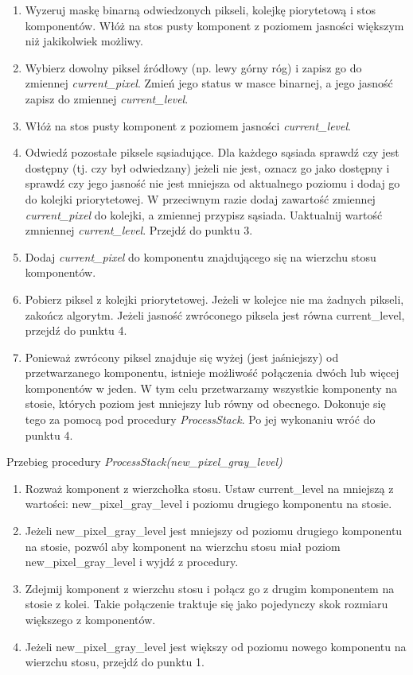\begin{enumerate} \item Wyzeruj maskę binarną odwiedzonych pikseli, kolejkę
    piorytetową i stos komponentów. Włóż na stos pusty komponent z poziomem
    jasności większym niż jakikolwiek możliwy. \item Wybierz dowolny piksel
    źródłowy (np. lewy górny róg) i zapisz go do zmiennej
    \textit{current\_pixel}.  Zmień jego status w masce binarnej, a jego
    jasność zapisz do zmiennej \textit{current\_level}. \item Włóż na stos
    pusty komponent z poziomem jasności \textit{current\_level}. \item Odwiedź
    pozostałe piksele sąsiadujące. Dla każdego sąsiada sprawdź czy jest
    dostępny (tj. czy był odwiedzany) jeżeli nie jest, oznacz go jako dostępny
    i sprawdź czy jego jasność nie jest mniejsza od aktualnego poziomu i dodaj
    go do kolejki priorytetowej. W przeciwnym razie dodaj zawartość zmiennej
    \textit{current\_pixel} do kolejki, a zmiennej przypisz sąsiada. Uaktualnij
    wartość zmniennej \textit{current\_level}. Przejdź do punktu 3. \item Dodaj
    \textit{current\_pixel} do komponentu znajdującego się na wierzchu stosu
    komponentów. \item Pobierz piksel z kolejki priorytetowej.  Jeżeli w
    kolejce nie ma żadnych pikseli, zakończ algorytm. Jeżeli jasność zwróconego
    piksela jest równa current\_level, przejdź do punktu 4. \item Ponieważ
    zwrócony piksel znajduje się wyżej (jest jaśniejszy) od przetwarzanego
    komponentu, istnieje możliwość połączenia dwóch lub więcej komponentów w
    jeden. W tym celu przetwarzamy wszystkie komponenty na stosie, których
    poziom jest mniejszy lub równy od obecnego. Dokonuje się tego za pomocą pod
    procedury \textit{ProcessStack}. Po jej wykonaniu wróć do punktu 4.
\end{enumerate}

Przebieg procedury \textit{ProcessStack(new\_pixel\_gray\_level)}
\begin{enumerate} \item Rozważ komponent z wierzchołka stosu. Ustaw
    current\_level na mniejszą z wartości: new\_pixel\_gray\_level i poziomu
    drugiego komponentu na stosie. \item Jeżeli new\_pixel\_gray\_level jest
    mniejszy od poziomu drugiego komponentu na stosie, pozwól aby komponent na
    wierzchu stosu miał poziom new\_pixel\_gray\_level i wyjdź z procedury.
  \item Zdejmij komponent z wierzchu stosu i połącz go z drugim komponentem na
    stosie z kolei.  Takie połączenie traktuje się jako pojedynczy skok
    rozmiaru większego z komponentów.  \item Jeżeli new\_pixel\_gray\_level
    jest większy od poziomu nowego komponentu na wierzchu stosu, przejdź do
    punktu 1.  \end{enumerate}

